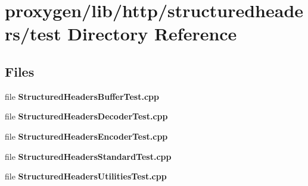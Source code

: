 \section{proxygen/lib/http/structuredheaders/test Directory Reference}
\label{dir_e5a9ff370d15b3bf6631323017166a48}
\subsection*{Files}
\begin{DoxyCompactItemize}
\item 
file {\bf Structured\+Headers\+Buffer\+Test.\+cpp}
\item 
file {\bf Structured\+Headers\+Decoder\+Test.\+cpp}
\item 
file {\bf Structured\+Headers\+Encoder\+Test.\+cpp}
\item 
file {\bf Structured\+Headers\+Standard\+Test.\+cpp}
\item 
file {\bf Structured\+Headers\+Utilities\+Test.\+cpp}
\end{DoxyCompactItemize}
